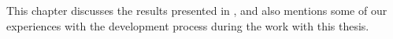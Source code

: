 This chapter discusses the results presented in , and
also mentions some of our experiences with the development process
during the work with this thesis.\\
